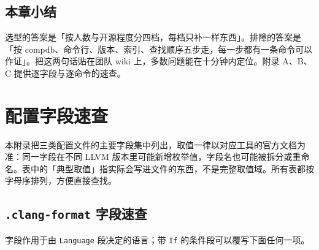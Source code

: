\documentclass[12pt,a4paper,fontset=fandol]{ctexbook}
\begin{document}
\section{本章小结}\label{sec:ch17-s15}

选型的答案是「按人数与开源程度分四档，每档只补一样东西」。排障的答案是「按 compdb、命令行、版本、索引、查找顺序五步走，每一步都有一条命令可以作证」。把这两句话贴在团队 wiki 上，多数问题能在十分钟内定位。附录 A、B、C 提供逐字段与逐命令的速查。

\appendix

\chapter{配置字段速查}\label{ch:appA}

本附录把三类配置文件的主要字段集中列出，取值一律以对应工具的官方文档为准：同一字段在不同 LLVM 版本里可能新增枚举值，字段名也可能被拆分或重命名。表中的「典型取值」指实际会写进文件的东西，不是完整取值域。所有表都按字母序排列，方便直接查找。

\section{\texttt{.clang-format} 字段速查}\label{sec:appA-s1}

字段作用于由 \texttt{Language} 段决定的语言；带 \texttt{If} 的条件段可以覆写下面任何一项。
\end{document}
